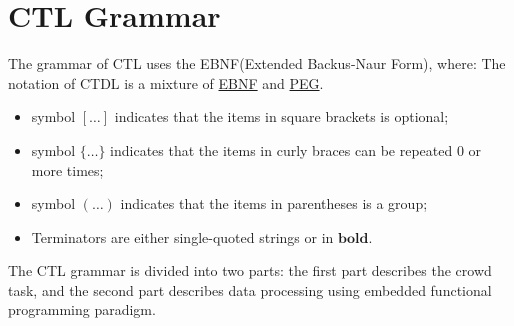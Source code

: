 \chapter{CTL Grammar}
The grammar of CTL uses the EBNF(Extended Backus-Naur Form), where:
The notation of CTDL is a mixture of \href{https://en.wikipedia.org/wiki/Extended_Backus%E2%80%93Naur_form}{EBNF} and \href{https://en.wikipedia.org/wiki/Parsing_expression_grammar}{PEG}. 
\begin{itemize}
    \item symbol $[\dots]$ indicates that the items in square brackets is optional;
    \item symbol $\{\dots\}$ indicates that the items in curly braces can be repeated 0 or more times;
    \item symbol $(\dots)$ indicates that the items in parentheses is a group;
    \item Terminators are either single-quoted strings or in $\mathbf{bold}$.
\end{itemize}
The CTL grammar is divided into two parts: the first part describes the crowd task, and the second part describes data processing using embedded functional programming paradigm.


